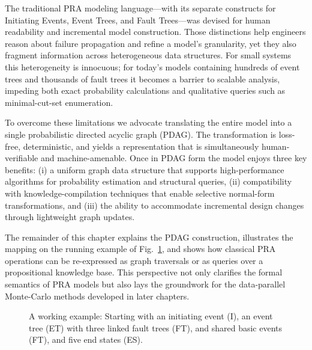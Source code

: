 


The traditional PRA modeling language—with its separate constructs for Initiating Events, Event Trees, and Fault Trees—was devised for human readability and incremental model construction.  Those distinctions help engineers reason about failure propagation and refine a model’s granularity, yet they also fragment information across heterogeneous data structures.  For small systems this heterogeneity is innocuous; for today’s models containing hundreds of event trees and thousands of fault trees it becomes a barrier to scalable analysis, impeding both exact probability calculations and qualitative queries such as minimal-cut-set enumeration.

To overcome these limitations we advocate translating the entire model into a single probabilistic directed acyclic graph (PDAG).  The transformation is loss-free, deterministic, and yields a representation that is simultaneously human-verifiable and machine-amenable.  Once in PDAG form the model enjoys three key benefits: (i) a uniform graph data structure that supports high-performance algorithms for probability estimation and structural queries, (ii) compatibility with knowledge-compilation techniques that enable selective normal-form transformations, and (iii) the ability to accommodate incremental design changes through lightweight graph updates.

The remainder of this chapter explains the PDAG construction, illustrates the mapping on the running example of Fig.~\ref{fig:et_ft_example}, and shows how classical PRA operations can be re-expressed as graph traversals or as queries over a propositional knowledge base.  This perspective not only clarifies the formal semantics of PRA models but also lays the groundwork for the data-parallel Monte-Carlo methods developed in later chapters.

\begin{figure}[p]
    \centering
    
    \caption{A working example: Starting with an initiating event (I), an event tree (ET) with three linked fault trees (FT), and shared basic events (FT), and five end states (ES).}
    \label{fig:et_ft_example}
\end{figure}

